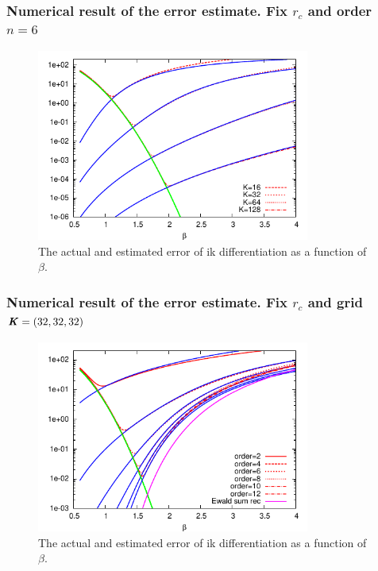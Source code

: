 \documentclass{beamer}
\renewcommand{\v}[1]{\textbf{\textit{#1}}}
\begin{document}
\begin{frame}[label=figure-fix-order]
  \frametitle{Numerical result of the error estimate. Fix $r_c$ and order $n=6$}
  \begin{figure}
  \includegraphics[width=0.8\textwidth]{figs/long-range//bspline-order6.pdf}
  \caption{The actual and estimated error of ik differentiation as a
    function of $\beta$.   } 
\end{figure}
\vfill\hfill
\hyperlink{tune-assumption}{}
\end{frame}


\begin{frame}[label=figure-fix-mesh]
  \frametitle{Numerical result of the error estimate. Fix $r_c$ and grid $\v K = (32, 32, 32)$}
  \begin{figure}
    \includegraphics[width=0.8\textwidth]{figs/long-range//bspline-mesh32.pdf}
    \caption{The actual and estimated error of ik differentiation as a
      function of $\beta$. }
  \end{figure} \hfill
  \hyperlink{expense-esti}{}
\end{frame}
\end{document}
